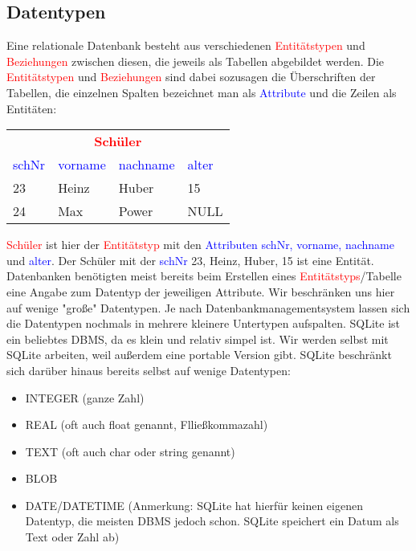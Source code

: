 \subsection{Datentypen}
Eine relationale Datenbank besteht aus verschiedenen \textcolor{red}{Entitätstypen} und \textcolor{red}{Beziehungen} zwischen diesen, die jeweils als Tabellen abgebildet werden. Die \textcolor{red}{Entitätstypen} und \textcolor{red}{Beziehungen} sind dabei sozusagen die Überschriften der Tabellen, die einzelnen Spalten bezeichnet man als \textcolor{blue}{Attribute} und die Zeilen als Entitäten:

\begin{table}[h]
	\centering
	\begin{tabular}{llll}
		\multicolumn{4}{c}{\textcolor{red}{\textbf{Schüler}}}\\
		\textcolor{blue}{schNr} 	& \textcolor{blue}{vorname} 	& \textcolor{blue}{nachname}	& \textcolor{blue}{alter}  \\
		\midrule
		23&Heinz&Huber&15\\
		24&Max&Power&NULL\\
	\end{tabular}
\end{table}
\textcolor{red}{Schüler} ist hier der \textcolor{red}{Entitätstyp} mit den \textcolor{blue}{Attributen schNr, vorname, nachname} und \textcolor{blue}{alter}. Der Schüler mit der \textcolor{blue}{schNr} 23, Heinz, Huber, 15 ist eine Entität.
Datenbanken benötigten meist bereits beim Erstellen eines \textcolor{red}{Entitätstyps}/Tabelle eine Angabe zum Datentyp der jeweiligen Attribute. Wir beschränken uns hier auf wenige "große" Datentypen. Je nach Datenbankmanagementsystem lassen sich die Datentypen nochmals in mehrere kleinere Untertypen aufspalten.
SQLite ist ein beliebtes DBMS, da es klein und relativ simpel ist. Wir werden selbst mit SQLite arbeiten, weil außerdem eine portable Version gibt. SQLite beschränkt sich darüber hinaus bereits selbst auf wenige Datentypen:
\begin{tcolorbox}[title=Datentypen]
	\begin{itemize}
		\item INTEGER (ganze Zahl)
		\item REAL (oft auch float genannt, Flließkommazahl)
		\item TEXT (oft auch char oder string genannt)
		\item BLOB
		\item DATE/DATETIME (Anmerkung: SQLite hat hierfür keinen eigenen Datentyp, die meisten DBMS jedoch schon. SQLite speichert ein Datum als Text oder Zahl ab)
	\end{itemize}
\end{tcolorbox}

